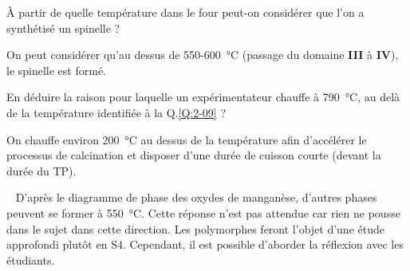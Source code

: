 \documentclass[twoside,a4paper,11pt,addpoints,answers]{exam}%
\newcounter{foo} %
\begin{document}
\begin{questions}

\question[\half] \label{Q:2-09} \`{A} partir de quelle température dans le four peut-on considérer que l'on a synthétisé un spinelle ?

\begin{mybox}\begin{solution}[2cm]
On peut considérer qu'au dessus de 550-\SI{600}{\celsius} (passage du domaine \textbf{III} à \textbf{IV}), le spinelle est formé.
\end{solution}\end{mybox}

\question[\half] \label{Q:2-10} En déduire la raison pour laquelle un expérimentateur chauffe à \SI{790}{\celsius}, au delà de la température identifiée à la Q.\ref{Q:2-09} ?

\begin{mybox}\begin{solution}[2cm]
On chauffe environ \SI{200}{\celsius} au dessus de la température afin d’accélérer le processus de calcination et disposer d'une durée de cuisson courte (devant la durée du TP). 

\faWarning ~ D'après le diagramme de phase des oxydes de manganèse, d'autres phases peuvent se former à \SI{550}{\celsius}. Cette réponse n'est pas attendue car rien ne pousse dans le sujet dans cette direction. Les polymorphes feront l'objet d'une étude approfondi plutôt en S4. Cependant, il est possible d'aborder la réflexion avec les étudiants.
\end{solution}\end{mybox}


\setcounter{foo}{\value{question}}
\end{questions}
\end{document}

